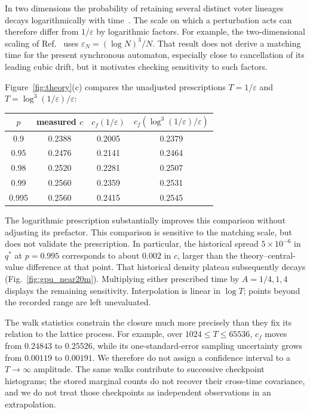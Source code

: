 In two dimensions the probability of retaining several distinct voter lineages
decays logarithmically with time~\cite{cox2010,cox2025}. The scale on which a
perturbation acts can therefore differ from $1/\varepsilon$ by logarithmic
factors. For example, the two-dimensional scaling of Ref.~\cite{cox2025}
uses $\varepsilon_N=(\log N)^3/N$. That result does not derive a matching
time for the present synchronous automaton, especially close to cancellation
of its leading cubic drift, but it motivates checking sensitivity to such
factors.

Figure~\ref{fig:theory}(c) compares the unadjusted prescriptions
$T=1/\varepsilon$ and $T=\log^3(1/\varepsilon)/\varepsilon$:
\begin{center}
\begin{tabular}{cccc}
$p$ & measured $c$ & $c_f(1/\varepsilon)$ & $c_f(\log^3(1/\varepsilon)/\varepsilon)$\\
\hline
0.9 & 0.2388 & 0.2005 & 0.2379\\
0.95 & 0.2476 & 0.2141 & 0.2464\\
0.98 & 0.2520 & 0.2281 & 0.2507\\
0.99 & 0.2560 & 0.2359 & 0.2531\\
0.995 & 0.2560 & 0.2415 & 0.2545
\end{tabular}
\end{center}
The logarithmic prescription substantially improves this comparison without
adjusting its prefactor. This comparison is sensitive to the matching scale, but does not validate
the prescription. In particular, the historical spread $5\times10^{-6}$ in
$q^*$ at $p=0.995$ corresponds to about $0.002$ in $c$, larger than the
theory--central-value difference at that point. That historical density
plateau subsequently decays (Fig.~\ref{fig:gpu_near20m}).
Multiplying either prescribed time by $A=1/4,1,4$ displays the remaining
sensitivity. Interpolation is linear in $\log T$; points beyond the recorded
range are left unevaluated.

The walk statistics constrain the closure much more precisely than they fix
its relation to the lattice process. For example, over $1024\le T\le65536$,
$c_f$ moves from $0.24843$ to $0.25526$, while its one-standard-error sampling
uncertainty grows from $0.00119$ to $0.00191$. We therefore do not assign a
confidence interval to a $T\to\infty$ amplitude. The same walks contribute
to successive checkpoint histograms; the stored marginal counts do not
recover their cross-time covariance, and we do not treat those checkpoints
as independent observations in an extrapolation.

